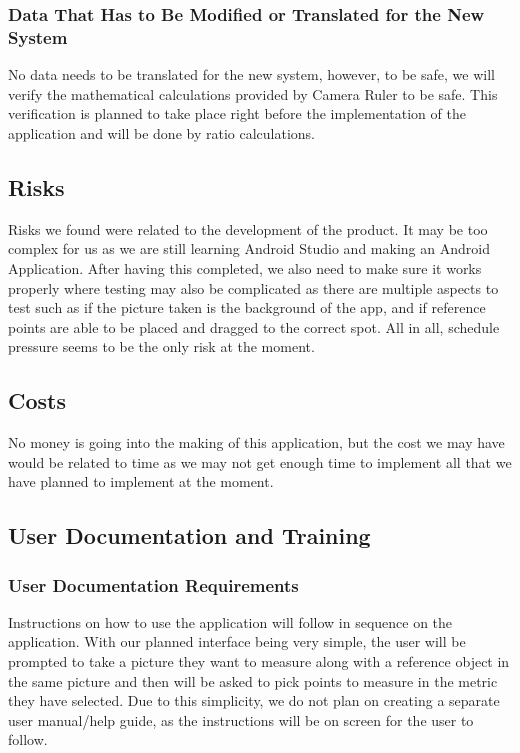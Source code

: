 \documentclass[12pt, titlepage]{article}
\begin{document}
\subsubsection{Data That Has to Be Modified or Translated for the New System}
No data needs to be translated for the new system, however, to be safe, we will verify the mathematical calculations provided by Camera Ruler to be safe. This verification is planned to take place right before the implementation of the application and will be done by ratio calculations. 
\subsection{Risks}
Risks we found were related to the development of the product. It may be too complex for us as we are still learning Android Studio and making an Android Application. After having this completed, we also need to make sure it works properly where testing may also be complicated as there are multiple aspects to test such as if the picture taken is the background of the app, and if reference points are able to be placed and dragged to the correct spot. All in all, schedule pressure seems to be the only risk at the moment.

\subsection{Costs}
No money is going into the making of this application, but the cost we may have would be related to time as we may not get enough time to implement all that we have planned to implement at the moment. 

\subsection{User Documentation and Training}
\subsubsection{User Documentation Requirements}
Instructions on how to use the application will follow in sequence on the application. With our planned interface being very simple, the user will be prompted to take a picture they want to measure along with a reference object in the same picture and then will be asked to pick points to measure in the metric they have selected. Due to this simplicity, we do not plan on creating a separate user manual/help guide, as the instructions will be on screen for the user to follow.
\end{document}
